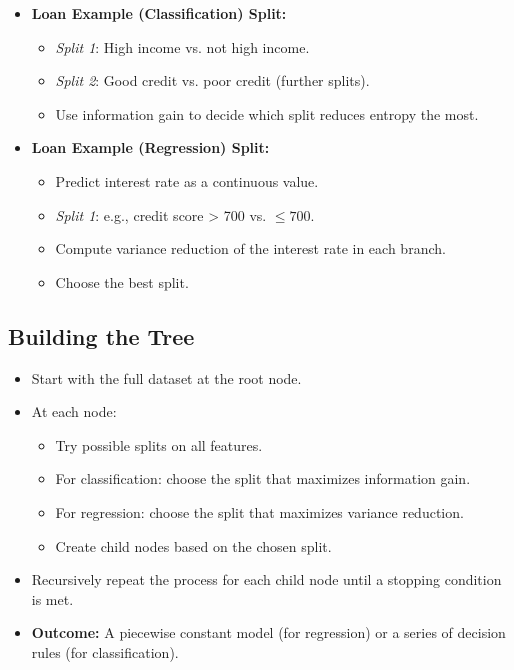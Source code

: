 \documentclass[10pt]{article}
\begin{document}
\begin{itemize}
    \item \textbf{Loan Example (Classification) Split:}
    \begin{itemize}
        \item \textit{Split 1}: High income vs. not high income.
        \item \textit{Split 2}: Good credit vs. poor credit (further splits).
        \item Use information gain to decide which split reduces entropy the most.
    \end{itemize}

    \item \textbf{Loan Example (Regression) Split:}
    \begin{itemize}
        \item Predict interest rate as a continuous value.
        \item \textit{Split 1}: e.g., credit score > 700 vs. \(\leq 700\).
        \item Compute variance reduction of the interest rate in each branch.
        \item Choose the best split.
    \end{itemize}
\end{itemize}

\subsection{Building the Tree}
\begin{itemize}
    \item Start with the full dataset at the root node.
    \item At each node:
    \begin{itemize}
        \item Try possible splits on all features.
        \item For classification: choose the split that maximizes information gain.
        \item For regression: choose the split that maximizes variance reduction.
        \item Create child nodes based on the chosen split.
    \end{itemize}
    \item Recursively repeat the process for each child node until a stopping condition is met.
    \item \textbf{Outcome:} A piecewise constant model (for regression) or a series of decision rules (for classification).
\end{itemize}
\end{document}
